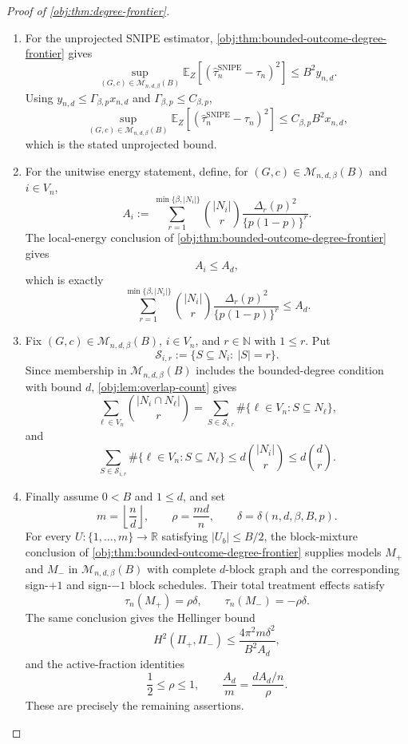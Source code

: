 \documentclass[11pt]{article}
\begin{document}
\begin{proof}[Proof of \cref{obj:thm:degree-frontier}]
\begin{enumerate}
\item
For the unprojected SNIPE estimator, \cref{obj:thm:bounded-outcome-degree-frontier} gives
\[
\sup_{(G,c)\in\mathcal M_{n,d,\beta}(B)}
\mathbb E_Z\!\left[
\left(\widehat\tau_n^{\mathrm{SNIPE}}-\tau_n\right)^2
\right]
\le
B^2y_{n,d}.
\]
Using \(y_{n,d}\le\Gamma_{\beta,p}x_{n,d}\) and \(\Gamma_{\beta,p}\le C_{\beta,p}\),
\[
\sup_{(G,c)\in\mathcal M_{n,d,\beta}(B)}
\mathbb E_Z\!\left[
\left(\widehat\tau_n^{\mathrm{SNIPE}}-\tau_n\right)^2
\right]
\le
C_{\beta,p}B^2x_{n,d},
\]
which is the stated unprojected bound. %

\item
For the unitwise energy statement, define, for \((G,c)\in\mathcal M_{n,d,\beta}(B)\) and \(i\in V_n\),
\[
A_i:=
\sum_{r=1}^{\min\{\beta,|N_i|\}}
\binom{|N_i|}{r}
\frac{\Delta_r(p)^2}{\{p(1-p)\}^r}.
\]
The local-energy conclusion of \cref{obj:thm:bounded-outcome-degree-frontier} gives
\[
A_i\le A_d,
\]
which is exactly
\[
\sum_{r=1}^{\min\{\beta,|N_i|\}}
\binom{|N_i|}{r}
\frac{\Delta_r(p)^2}{\{p(1-p)\}^r}
\le
A_d.
\] %

\item
Fix \((G,c)\in\mathcal M_{n,d,\beta}(B)\), \(i\in V_n\), and \(r\in\mathbb N\) with \(1\le r\).  Put
\[
\mathcal S_{i,r}:=\{S\subseteq N_i:\ |S|=r\}.
\]
Since membership in \(\mathcal M_{n,d,\beta}(B)\) includes the bounded-degree condition with bound \(d\), \cref{obj:lem:overlap-count} gives
\[
\sum_{\ell\in V_n}
\binom{|N_i\cap N_\ell|}{r}
=
\sum_{S\in\mathcal S_{i,r}}
\#\{\ell\in V_n:S\subseteq N_\ell\},
\]
and
\[
\sum_{S\in\mathcal S_{i,r}}
\#\{\ell\in V_n:S\subseteq N_\ell\}
\le
d\binom{|N_i|}{r}
\le
d\binom{d}{r}.
\] %

\item
Finally assume \(0<B\) and \(1\le d\), and set
\[
m=\left\lfloor\frac nd\right\rfloor,
\qquad
\rho=\frac{md}{n},
\qquad
\delta=\delta(n,d,\beta,B,p).
\]
For every \(U:\{1,\ldots,m\}\to\mathbb R\) satisfying \(|U_b|\le B/2\), the block-mixture conclusion of \cref{obj:thm:bounded-outcome-degree-frontier} supplies models \(M_+\) and \(M_-\) in \(\mathcal M_{n,d,\beta}(B)\) with complete \(d\)-block graph and the corresponding sign-\(+1\) and sign-\(-1\) block schedules.  Their total treatment effects satisfy
\[
\tau_n(M_+)=\rho\delta,
\qquad
\tau_n(M_-)=-\rho\delta.
\]
The same conclusion gives the Hellinger bound
\[
H^2(\Pi_+,\Pi_-)
\le
\frac{4\pi^2m\delta^2}{B^2A_d},
\]
and the active-fraction identities
\[
\frac12\le\rho\le1,
\qquad
\frac{A_d}{m}
=
\frac{dA_d/n}{\rho}.
\]
These are precisely the remaining assertions. %
\end{enumerate}
\end{proof}
\end{document}

